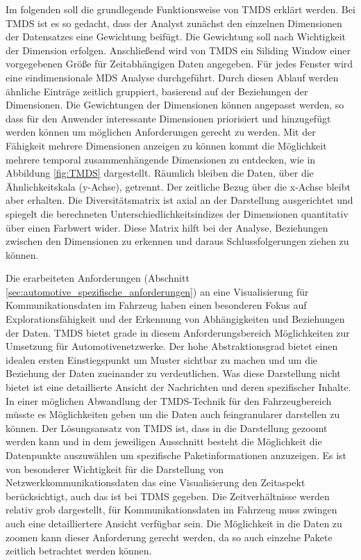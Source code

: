 \documentclass[draft=false
              ,paper=a4
              ,twoside=false
              ,fontsize=11pt
              ,headsepline
              ,BCOR10mm
              ,DIV11
              ]{scrbook}
\begin{document}
Im folgenden soll die grundlegende Funktionsweise von TMDS erklärt werden. Bei TMDS ist es so gedacht, dass der Analyst zunächst den einzelnen Dimensionen der Datensatzes eine Gewichtung beifügt. Die Gewichtung soll nach Wichtigkeit der Dimension erfolgen. Anschließend wird von TMDS ein Siliding Window einer vorgegebenen Größe für Zeitabhängigen Daten angegeben. Für jedes Fenster wird eine eindimensionale MDS Analyse durchgeführt. Durch diesen Ablauf werden ähnliche Einträge zeitlich gruppiert, basierend auf der Beziehungen der Dimensionen. Die Gewichtungen der Dimensionen können angepasst werden, so dass für den Anwender interessante Dimensionen priorisiert und hinzugefügt werden können um möglichen Anforderungen gerecht zu werden. Mit der Fähigkeit mehrere Dimensionen anzeigen zu können kommt die Möglichkeit mehrere temporal zusammenhängende Dimensionen zu entdecken, wie in Abbildung \ref{fig:TMDS} dargestellt. Räumlich bleiben die Daten, über die Ähnlichkeitskala (y-Achse), getrennt. Der zeitliche Bezug über die x-Achse bleibt aber erhalten. Die Diversitätsmatrix ist axial an der Darstellung ausgerichtet und spiegelt die berechneten Unterschiedlichkeitsindizes der Dimensionen quantitativ über einen Farbwert wider. Diese Matrix hilft bei der Analyse, Beziehungen zwischen den Dimensionen zu erkennen und daraus Schlussfolgerungen ziehen zu können.

Die erarbeiteten Anforderungen (Abschnitt \ref{sec:automotive_spezifische_anforderungen}) an eine Visualisierung für Kommunikationsdaten im Fahrzeug haben einen besonderen Fokus auf Explorationsfähigkeit und der Erkennung von Abhängigkeiten und Beziehungen der Daten. TMDS bietet grade in diesem Anforderungsbereich Möglichkeiten zur Umsetzung für Automotivenetzwerke. Der hohe Abstraktionsgrad bietet einen idealen ersten Einstiegspunkt um Muster sichtbar zu machen und um die Beziehung der Daten zueinander zu verdeutlichen. Was diese Darstellung nicht bietet ist eine detaillierte Ansicht der Nachrichten und deren spezifischer Inhalte. In einer möglichen Abwandlung der TMDS-Technik für den Fahrzeugbereich müsste es Möglichkeiten geben um die Daten auch feingranularer darstellen zu können. Der Lösungsansatz von TMDS ist, dass in die Darstellung gezoomt werden kann und in dem jeweiligen Ausschnitt besteht die Möglichkeit die Datenpunkte auszuwählen um spezifische Paketinformationen anzuzeigen. 
Es ist von besonderer Wichtigkeit für die Darstellung von Netzwerkkommunikationsdaten das eine Visualisierung den Zeitaspekt berücksichtigt, auch das ist bei TDMS gegeben. Die Zeitverhältnisse werden relativ grob dargestellt, für Kommunikationsdaten im Fahrzeug muss zwingen auch eine detailliertere Ansicht verfügbar sein. Die Möglichkeit in die Daten zu zoomen kann dieser Anforderung gerecht werden, da so auch einzelne Pakete zeitlich betrachtet werden können. 
\end{document}
